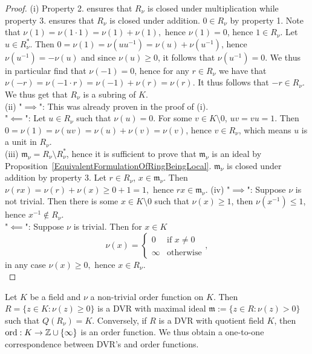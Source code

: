     \begin{proof}
        (i) Property 2. ensures that $R_\nu$ is closed under multiplication while property 3. ensures that $R_\nu$ is closed under addition. $0\in R_\nu$ by property 1. Note that $\nu(1)=\nu(1\cdot1)=\nu(1)+\nu(1),$ hence $\nu(1)=0$, hence $1\in R_\nu$. Let $u\in R_\nu^\ast$. Then $0=\nu(1)=\nu(uu^{-1}) = \nu(u)+\nu(u^{-1})$, hence $\nu(u^{-1})=-\nu(u)$ and since $\nu(u)\geq0$, it follows that $\nu(u^{-1})=0$. We thus in particular find that $\nu(-1)=0$, hence for any $r\in R_\nu$ we have that $\nu(-r)=\nu(-1\cdot r)=\nu(-1)+\nu(r)=\nu(r)$. It thus follows that $-r\in R_\nu$. We thus get that $R_\nu$ is a subring of $K$.\\
        (ii) "$\implies$": This was already proven in the proof of (i).\\
        "$\impliedby$": Let $u\in R_\nu$ such that $\nu(u)=0$. For some $v\in K\setminus 0$, $uv=vu=1$. Then $0=\nu(1)=\nu(uv)=\nu(u)+\nu(v) = \nu(v)$, hence $v\in R_\nu$, which means $u$ is a unit in $R_\nu$.\\
        (iii) $\mathfrak{m}_\nu=R_\nu\setminus R_\nu^\ast$, hence it is sufficient to prove that $\mathfrak{m}_\nu$ is an ideal by Proposition~\ref{EquivalentFormulationOfRingBeingLocal}. $\mathfrak{m}_\nu$ is closed under addition by property 3. Let $r\in R_\nu$, $x\in \mathfrak{m}_\nu$. Then $\nu(rx)=\nu(r)+\nu(x)\geq 0+1=1,$ hence $rx\in \mathfrak{m}_\nu$.
        (iv) "$\implies$": Suppose $\nu$ is not trivial. Then there is some $x\in K\setminus 0$ such that $\nu(x)\geq 1$, then $\nu(x^{-1})\leq 1$, hence $x^{-1}\notin R_\nu$.\\
        "$\impliedby$": Suppose $\nu$ is trivial. Then for $x\in K$
        $$\nu(x)=\begin{cases}
            0 & \text{if } x\neq 0\\
            \infty &\text{otherwise}
        \end{cases},$$
        in any case $\nu(x)\geq 0,$ hence $x\in R_\nu$.\\
    \end{proof}
    \begin{theorem}
        Let $K$ be a field and $\nu$ a non-trivial order function on $K$. Then $R=\{z\in K : \nu(z)\geq 0\}$ is a DVR with maximal ideal $\mathfrak{m}:=\{z\in R : \nu(z)>0\}$ such that $Q(R_\nu)=K$. Conversely, if $R$ is a DVR with quotient field $K$, then $\mathrm{ord} : K \rightarrow \mathbb{Z}\cup \{\infty\}$ is an order function. We thus obtain a one-to-one correspondence between DVR's and order functions. 
    \end{theorem}
